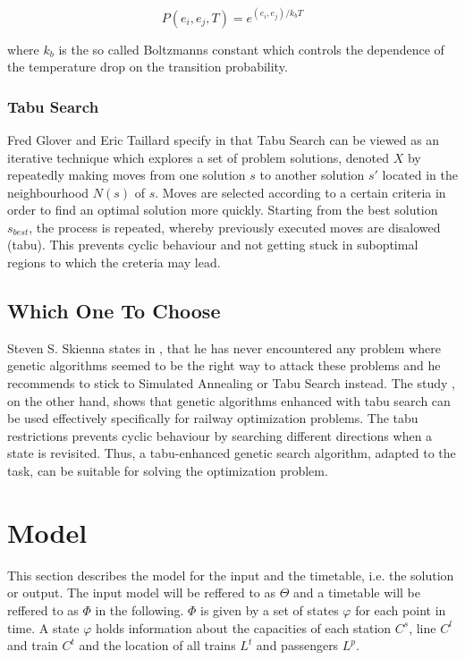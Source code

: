 \documentclass[a4paper,10pt,parskip]{article}
\begin{document}
$$
P(e_i, e_j, T) = e^{(e_i, e_j)/k_bT}
$$

where $k_b$ is the so called Boltzmanns constant which controls the dependence of 
the temperature drop on the transition probability.

\subsubsection{Tabu Search}
\label{sec:tabu}

Fred Glover and Eric Taillard specify in \cite{glover1993} that Tabu Search can 
be viewed as an iterative technique which explores a set of problem solutions,
denoted $X$ by repeatedly making moves from one solution $s$ to another solution 
$s'$ located in the neighbourhood $N(s)$ of $s$. Moves are selected according to 
a certain criteria in order to find an optimal solution more quickly. Starting from 
the best solution $s_{best}$, the process is repeated, whereby previously executed 
moves are disalowed (tabu). This prevents cyclic behaviour and not getting stuck 
in suboptimal regions to which the creteria may lead.

\subsection{Which One To Choose}

Steven S. Skienna states in \cite{skienna08}, that he has never encountered any 
problem where genetic algorithms seemed to be the right way to attack these 
problems and he recommends to stick to Simulated Annealing or Tabu Search instead. 
The study \cite{FrancisGorman1998}, on the other hand, shows that genetic 
algorithms enhanced with tabu search can be used effectively specifically for 
railway optimization problems. The tabu restrictions prevents cyclic behaviour by 
searching different directions when a state is revisited. Thus, a tabu-enhanced 
genetic search algorithm, adapted to the task, can be suitable for solving the 
optimization problem.

\section{Model}

This section describes the model for the input and the timetable, i.e. the 
solution or output. 
The input model will be reffered to as $\Theta$ and a timetable will be reffered 
to as $\Phi$ in the following. $\Phi$ is given by a set of states $\varphi$ for 
each point in time. A state $\varphi$ holds information about the capacities of 
each station $C^s$, line $C^l$ and train $C^t$ and the location of all trains 
$L^t$ and passengers $L^p$.
\end{document}
